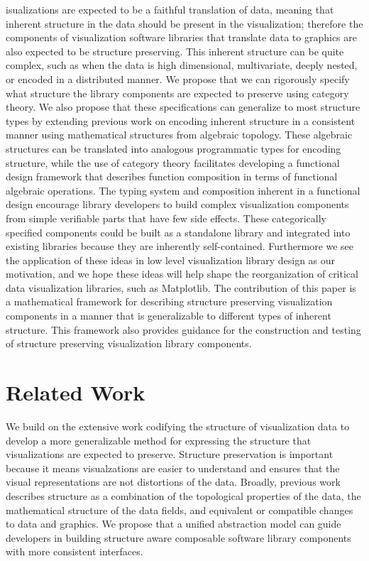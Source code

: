 \documentclass[10pt,journal,compsoc]{IEEEtran}
\theoremstyle{definition}
\theoremstyle{remark}
\begin{document}
isualizations are expected to be a faithful translation of data, meaning that inherent structure in the data should be present in the visualization; therefore the components of visualization software libraries that translate data to graphics are also expected to be structure preserving. This inherent structure can be quite complex, such as when the data is high dimensional, multivariate, deeply nested, or encoded in a distributed manner. We propose that we can rigorously specify what structure the library components are expected to preserve using category theory. We also propose that these specifications can generalize to most structure types by extending previous work on encoding  inherent structure in a consistent manner using mathematical structures from algebraic topology. These algebraic structures can be translated into analogous programmatic types for encoding structure, while the use of category theory facilitates developing a functional design framework that describes function composition in terms of functional algebraic operations. The typing system and composition inherent in a functional design encourage library developers to build complex visualization components from simple verifiable parts that have few side effects\cite{huHowFunctionalProgramming2015, hughesWhyFunctionalProgramming1989}. These categorically specified components could be built as a standalone library and integrated into existing libraries because they are inherently self-contained. Furthermore we see the application of these ideas in low level visualization library design as our motivation, and we hope these ideas will help shape the reorganization of critical data visualization libraries, such as Matplotlib. The contribution of this paper is a mathematical framework for describing structure preserving visualization components in a manner that is generalizable to different types of inherent structure. This framework also provides guidance for the construction and testing of structure preserving visualization library components. 


\section{Related Work}
We build on the extensive work codifying the structure of visualization data to develop a more generalizable method for expressing the structure that visualizations are expected to preserve. Structure preservation is important because it means visualzations are easier to understand \cite{norman_things_smart} and ensures that the visual representations are not distortions of the data\cite{tufteVisualDisplayQuantitative2001}. Broadly, previous work describes structure as a combination of the topological properties of the data, the mathematical structure of the data fields, and equivalent or compatible changes to data and graphics. We propose that a unified abstraction model can guide developers in building structure aware composable software library components with more consistent interfaces. 
\end{document}
